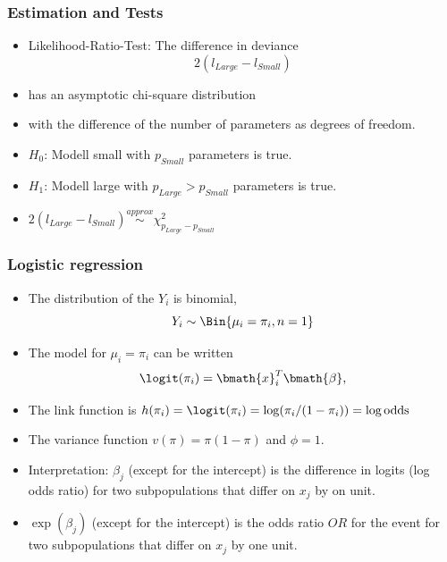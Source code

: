 \documentclass[extsize,handout,10pt]{beamer}\usepackage[]{graphicx}\usepackage[]{color}
\begin{document}
\begin{frame}
  \frametitle{Estimation and Tests}
  \begin{itemize}
  \item \alert{Likelihood-Ratio-Test:} The difference in deviance 
    \begin{equation}
      \label{eq:3}
      2(l_{Large}-l_{Small})
    \end{equation}
  \item has an asymptotic chi-square distribution 
  \item with the difference of the number of parameters as degrees of
    freedom.
\end{itemize}
\begin{alertblock}

\begin{itemize}
\item $H_0$: Modell small with $p_{Small}$ parameters is true.
\item $H_1$: Modell large with $p_{Large}>p_{Small}$ parameters is
  true.
\item $2(l_{Large}-l_{Small})\overset{approx}{\sim} \chi^2_{p_{Large}-p_{Small}}$
\end{itemize}
\end{alertblock}

\end{frame}


\begin{frame}
  \frametitle{Logistic regression}
  \begin{itemize}
  \item The distribution of the $Y_i$ is binomial,
    $$Y_i\sim \Bin{\mu_i=\pi_i,n=1}$$
  \item The model for $\mu_i=\pi_i$ can be written
    \begin{equation}
      \label{eq:57}
      \logit(\pi_i)=\bmath{x}^T_i\bmath{\beta},
    \end{equation}
  \item The link function is
    $h(\pi_i)=\logit(\pi_i)=\log(\pi_i/(1-\pi_i))=\log \mathrm{odds}$
  \item The variance function $v(\pi)=\pi(1-\pi)$ and $\phi=1$.
  \item Interpretation: $\beta_j$ (except for the intercept) is the difference in logits (\alert{log
    odds ratio}) for two subpopulations that differ on $x_j$ by on unit.
  \item $\exp(\beta_j)$ (except for the intercept) is the \alert{odds
      ratio} $OR$ for the event for two subpopulations that differ on $x_j$ by one
    unit.
  \end{itemize}
\end{frame}
\end{document}
